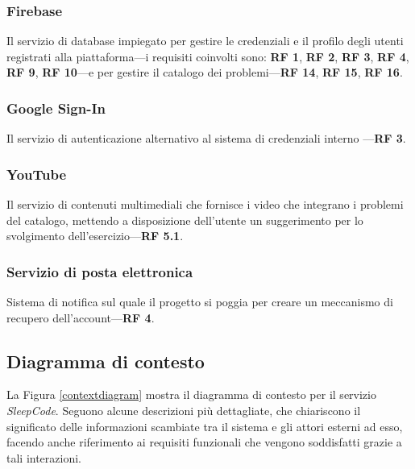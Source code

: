 \documentclass[11pt, a4paper]{article}
\theoremstyle{definition} %
\begin{document}
\subsubsection{Firebase}
Il servizio di database impiegato per gestire le credenziali e il profilo
degli utenti registrati alla piattaforma—i requisiti coinvolti sono: \textbf{RF 1},
\textbf{RF 2}, \textbf{RF 3}, \textbf{RF 4}, \textbf{RF 9}, \textbf{RF 10}—e per gestire il
catalogo dei problemi—\textbf{RF 14}, \textbf{RF 15}, \textbf{RF 16}.

\subsubsection{Google Sign-In}
Il servizio di autenticazione alternativo al sistema di credenziali interno
—\textbf{RF 3}.

\subsubsection{YouTube}
Il servizio di contenuti multimediali che fornisce i video che integrano
i problemi del catalogo, mettendo a disposizione dell'utente un suggerimento per lo
svolgimento dell'esercizio—\textbf{RF 5.1}.

\subsubsection{Servizio di posta elettronica}
Sistema di notifica sul quale il progetto si poggia per creare un
meccanismo di recupero dell'account—\textbf{RF 4}.

\newpage
\subsection{Diagramma di contesto} %
La Figura \ref{contextdiagram} mostra il diagramma di contesto per il
servizio \textit{SleepCode}. Seguono alcune descrizioni più dettagliate,
che chiariscono il significato delle informazioni scambiate tra il sistema
e gli attori esterni ad esso, facendo anche riferimento ai requisiti
funzionali che vengono soddisfatti grazie a tali interazioni.
\end{document}
